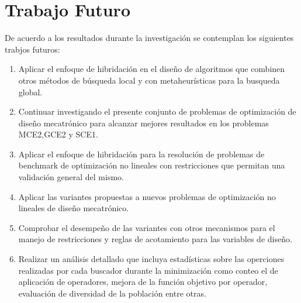  \section{Trabajo Futuro}
 De acuerdo a los resultados durante la investigación se contemplan los siguientes trabjos futuros:
 \begin{enumerate}
    \item Aplicar el enfoque de hibridación en el diseño de algoritmos que combinen otros métodos de búsqueda local y con metaheurísticas para la busqueda global. 
    \item Continuar investigando el presente conjunto de problemas de optimización de diseño mecatrónico para alcanzar mejores resultados en los problemas MCE2,GCE2 y SCE1.
    \item Aplicar el enfoque de hibridación para la resolución de problemas de benchmark de optimización no lineales con restricciones que permitan una validación general del mismo. 
    \item Aplicar las variantes propuestas a nuevos problemas de optimización no lineales de diseño mecatrónico.
    \item Comprobar el desempeño de las variantes con otros mecanismos para el manejo de restricciones y reglas de acotamiento para las variables de diseño.
    \item Realizar un análisis detallado que incluya estadísticas sobre las operciones realizadas por cada buscador durante la minimización como  conteo el de aplicación de operadores, mejora de la función objetivo por operador, evaluación de diversidad de la población entre otras.
 
 \end{enumerate}
 
